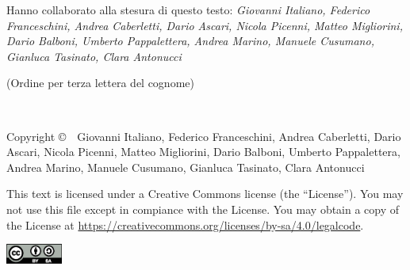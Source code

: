 \documentclass[a4paper,oneside]{tufte-book}
\theoremstyle{importante}
\begin{document}
\newpage
\newcommand{\contributori}{Giovanni Italiano, Federico Franceschini,
  Andrea Caberletti, Dario Ascari, Nicola Picenni, Matteo Migliorini,
  Dario Balboni, Umberto Pappalettera, Andrea Marino, Manuele Cusumano,
  Gianluca Tasinato, Clara Antonucci}
\begin{fullwidth}
\begin{doublespace}
  \thispagestyle{empty}
  \setlength{\parindent}{0pt}
  \setlength{\parskip}{\baselineskip}
  {\justify
  \noindent\fontsize{16}{16}\selectfont\scshape
  \par\nohyphenation\noindent Hanno collaborato alla stesura di questo testo:
  \itshape\contributori

  (Ordine per terza lettera del cognome)
  }
\end{doublespace}

~\vfill
\thispagestyle{empty}
\setlength{\parindent}{0pt}
\setlength{\parskip}{\baselineskip}
{
  \justify
  \par\nohyphenation Copyright \copyright\ \the\year\ \contributori
}


\par{}

\par\justify\nohyphenation This text is licensed under a Creative Commons
license (the ``License''). You may not use this file
except in compiance with the License. You may obtain a
copy of the License at \url{https://creativecommons.org/licenses/by-sa/4.0/legalcode}.

\includegraphics[width=5em]{by-sa.eps}

\end{fullwidth}

\tableofcontents


%
\end{document}
